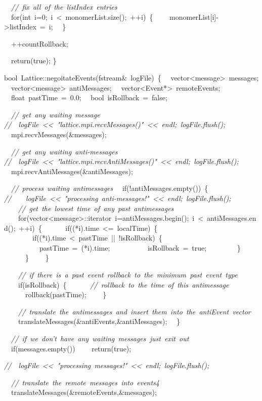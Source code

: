 {\ \ \textsl{//\ fix\ all\ of\ the\ listIndex\ entries}
\ \ for(int\ i=0;\ i\ <{}\ monomerList.size();\ ++i)\ \{
\ \ \ \ monomerList[i]-{}>{}listIndex\ =\ i;
\ \ \}

\ \ ++countRollback;

\ \ return(true);
\}

bool\ Lattice::negoitateEvents(fstream\&\ logFile)\ \{
\ \ vector<{}message>{}\ messages;
\ \ vector<{}message>{}\ antiMessages;
\ \ vector<{}Event*>{}\ remoteEvents;
\ \ float\ pastTime\ =\ 0.0;
\ \ bool\ isRollback\ =\ false;

\ \ \textsl{//\ get\ any\ waiting\ message}
\textsl{//\ \ logFile\ <{}<{}\ "{}lattice.mpi.recvMessages()"{}\ <{}<{}\ endl;\ logFile.flush();}
\ \ mpi.recvMessages(\&messages);

\ \ \textsl{//\ get\ any\ waiting\ anti-{}messages}
\textsl{//\ \ logFile\ <{}<{}\ "{}lattice.mpi.recvAntiMessages()"{}\ <{}<{}\ endl;\ logFile.flush();}
\ \ mpi.recvAntiMessages(\&antiMessages);

\ \ \textsl{//\ process\ waiting\ antimessages}
\ \ if(!antiMessages.empty())\ \{
\textsl{//\ \ \ \ logFile\ <{}<{}\ "{}processing\ anti-{}messages!"{}\ <{}<{}\ endl;\ logFile.flush();}
\ \ \ \ \textsl{//\ get\ the\ lowest\ time\ of\ any\ past\ antimessages}
\ \ \ \ for(vector<{}message>{}::iterator\ i=antiMessages.begin();\ i\ <{}\ antiMessages.end();\ ++i)\ \{
\ \ \ \ \ \ if((*i).time\ <{}=\ localTime)\ \{
\ \ \ \ \ \ \ \ if((*i).time\ <{}\ pastTime\ ||\ !isRollback)\ \{
\ \ \ \ \ \ \ \ \ \ pastTime\ =\ (*i).time;
\ \ \ \ \ \ \ \ \ \ isRollback\ =\ true;
\ \ \ \ \ \ \ \ \}
\ \ \ \ \ \ \}
\ \ \ \ \}

\ \ \ \ \textsl{//\ if\ there\ is\ a\ past\ event\ rollback\ to\ the\ minimum\ past\ event\ type}
\ \ \ \ if(isRollback)\ \{
\ \ \ \ \ \ \textsl{//\ rollback\ to\ the\ time\ of\ this\ antimessage}
\ \ \ \ \ \ rollback(pastTime);
\ \ \ \ \}

\ \ \ \ \textsl{//\ translate\ the\ antimessages\ and\ insert\ them\ into\ the\ antiEvent\ vector}
\ \ \ \ translateMessages(\&antiEvents,\&antiMessages);
\ \ \}

\ \ \textsl{//\ if\ we\ don't\ have\ any\ waiting\ messages\ just\ exit\ out}
\ \ if(messages.empty())
\ \ \ \ return(true);

\textsl{//\ \ logFile\ <{}<{}\ "{}processing\ messages!"{}\ <{}<{}\ endl;\ logFile.flush();}

\ \ \textsl{//\ translate\ the\ remote\ messages\ into\ events4}
\ \ translateMessages(\&remoteEvents,\&messages);

}
